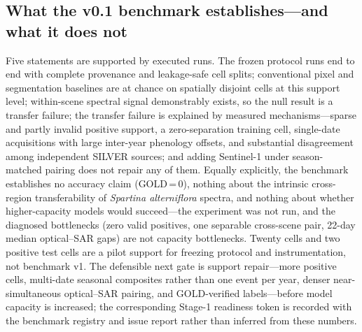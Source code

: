 

\subsection{What the v0.1 benchmark establishes---and what it does not}
Five statements are supported by executed runs. The frozen protocol
runs end to end with complete provenance and leakage-safe cell
splits; conventional pixel and segmentation baselines are at chance on
spatially disjoint cells at this support level; within-scene spectral
signal demonstrably exists, so the null result is a transfer failure;
the transfer failure is explained by measured mechanisms---sparse and
partly invalid positive support, a zero-separation training cell,
single-date acquisitions with large inter-year phenology offsets, and
substantial disagreement among independent SILVER sources; and adding
Sentinel-1 under season-matched pairing does not repair any of them.
Equally explicitly, the benchmark establishes no accuracy claim
(GOLD\,=\,0), nothing about the intrinsic cross-region
transferability of \emph{Spartina alterniflora} spectra, and nothing
about whether higher-capacity models would succeed---the experiment was
not run, and the diagnosed bottlenecks (zero valid positives, one
separable cross-scene pair, 22-day median optical--SAR gaps) are not
capacity bottlenecks. Twenty cells and two positive test cells are a
pilot support for freezing protocol and instrumentation, not benchmark
v1. The defensible next gate is support repair---more positive cells,
multi-date seasonal composites rather than one event per year, denser
near-simultaneous optical--SAR pairing, and GOLD-verified labels---before
model capacity is increased; the corresponding Stage-1 readiness token
is recorded with the benchmark registry and issue report rather than
inferred from these numbers.

\begin{figure}[t]\centering
{}
\label{fig:silverbench}
\end{figure}
